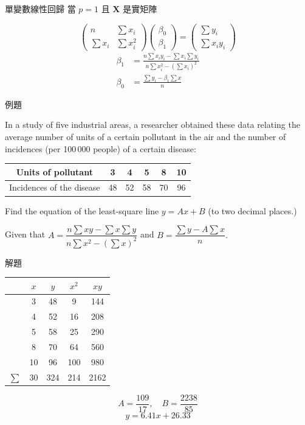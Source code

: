 \documentclass{beamer}
\begin{document}
\begin{CJK}{UTF8}{bsmi}
\begin{frame}{單變數線性回歸}
  當 $p = 1$ 且 $\mathbf X$ 是實矩陣
  \begin{solution}
    \[\begin{pmatrix} n& \sum x_i\\ \sum x_i& \sum x_i^2 \end{pmatrix}\begin{pmatrix} \beta_0\\ \beta_1 \end{pmatrix}
	= \begin{pmatrix} \sum y_i\\ \sum x_iy_i \end{pmatrix}\]
    \begin{align*}
      \beta_1 &= \frac{n \sum x_iy_i - \sum x_i \sum y_i}{n \sum x_i^2 - \left( \sum x_i \right)^2}\\
      \beta_0 &= \frac{\sum y_i - \beta_1 \sum x}{n}
    \end{align*}
  \end{solution}
\end{frame}

\begin{frame}{例題}
  \begin{example}
    In a study of five industrial areas, a researcher obtained these data relating the average number of units of a certain
    pollutant in the air and the number of incidences (per 100\,000 people) of a certain disease:
    \begin{center}
      \begin{tabular}{c|ccccc}
	Units of pollutant       &  3&  4&  5&  8& 10\\
	\hline
	Incidences of the disease& 48& 52& 58& 70& 96
      \end{tabular}
    \end{center}
    Find the equation of the least-square line $y = Ax + B$ (to two decimal places.)
    \centerline{Given that $A = \dfrac{n \sum xy - \sum x \sum y}{n \sum x^2 - (\sum x)^2}$ and $B
	= \dfrac{\sum y - A \sum x}{n}.$}
  \end{example}
\end{frame}

\begin{frame}{解題}
  \begin{solution}
    \begin{center}
      \begin{tabular}{ccccc}
	      & $x$& $y$& $x^2$& $xy$\\
	\hline
	      &   3&  48&     9&  144\\
	      &   4&  52&    16&  208\\
	      &   5&  58&    25&  290\\
	      &   8&  70&    64&  560\\
	      &  10&  96&   100&  980\\
	\hline
	$\sum$&  30& 324&   214& 2162
      \end{tabular}
    \end{center}
    \[A = \frac{109}{17},\quad B = \frac{2238}{85}\]
    \[y = 6.41 x + 26.33\]
  \end{solution}
\end{frame}


\end{CJK}
\end{document}

